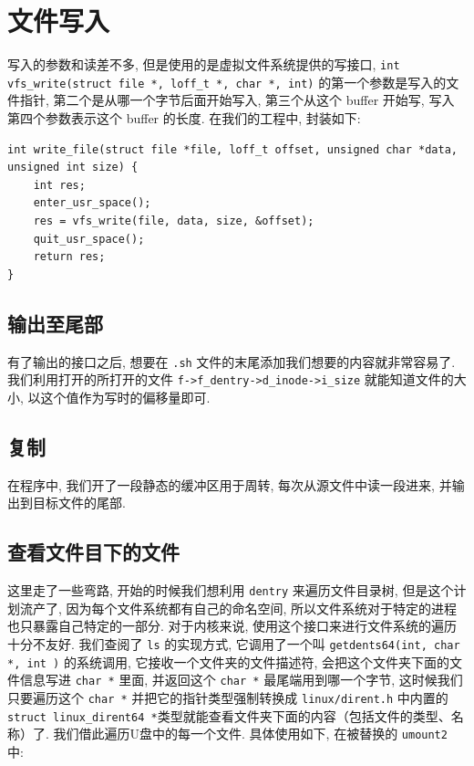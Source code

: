 \documentclass[11pt,fleqn]{book} %
\begin{document}
\vspace*{0.5cm}


\section{文件写入}



写入的参数和读差不多, 但是使用的是虚拟文件系统提供的写接口, \texttt{int vfs\_write(struct file
{*}, loff\_t {*}, char {*}, int)} 的第一个参数是写入的文件指针, 第二个是从哪一个字节后面开始写入,
第三个从这个 buffer 开始写, 写入第四个参数表示这个 buffer 的长度. 在我们的工程中, 封装如下: 

\vspace*{0.5cm}

\begin{lstlisting}
int write_file(struct file *file, loff_t offset, unsigned char *data, unsigned int size) {
	int res;
	enter_usr_space();
	res = vfs_write(file, data, size, &offset);
	quit_usr_space();
	return res;
}
\end{lstlisting}


\vspace*{0.5cm}


\subsection{输出至尾部}

有了输出的接口之后, 想要在 \texttt{.sh} 文件的末尾添加我们想要的内容就非常容易了. 我们利用打开的所打开的文件 \texttt{f->f\_dentry->d\_inode->i\_size}
就能知道文件的大小, 以这个值作为写时的偏移量即可.  


\subsection{复制}

在程序中, 我们开了一段静态的缓冲区用于周转, 每次从源文件中读一段进来, 并输出到目标文件的尾部.  


\subsection{查看文件目下的文件\label{section:FS}}

这里走了一些弯路, 开始的时候我们想利用 \texttt{dentry} 来遍历文件目录树, 但是这个计划流产了, 因为每个文件系统都有自己的命名空间,
所以文件系统对于特定的进程也只暴露自己特定的一部分. 对于内核来说, 使用这个接口来进行文件系统的遍历十分不友好. 我们查阅了 \texttt{ls}
的实现方式, 它调用了一个叫 \texttt{getdents64(int, char {*}, int )} 的系统调用, 它接收一个文件夹的文件描述符,
会把这个文件夹下面的文件信息写进 \texttt{char {*}} 里面, 并返回这个 \texttt{char {*}} 最尾端用到哪一个字节,
这时候我们只要遍历这个 \texttt{char {*}} 并把它的指针类型强制转换成 \texttt{linux/dirent.h}
中内置的 \texttt{struct linux\_dirent64 {*}}类型就能查看文件夹下面的内容（包括文件的类型、名称）了.
我们借此遍历U盘中的每一个文件. 具体使用如下, 在被替换的 \texttt{umount2} 中: 
\end{document}
